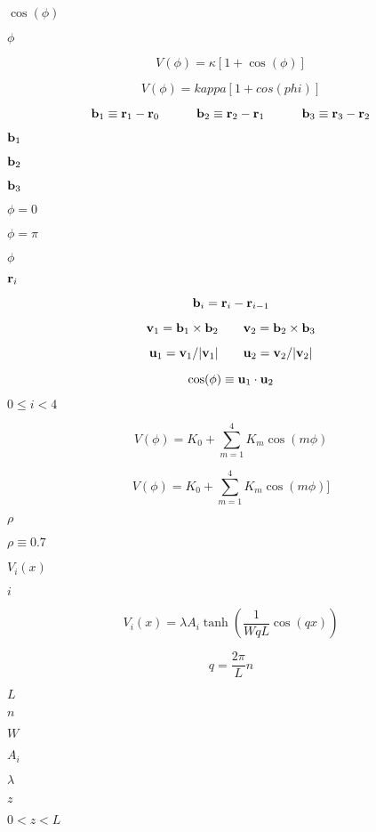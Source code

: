 \documentclass{article}
\begin{document}
$\cos(\phi)$
\pagebreak

$\phi$
\pagebreak

\[ V(\phi) = \kappa [ 1 + \cos(\phi) ] \]
\pagebreak

\[ V(\phi) = kappa [1 + cos(phi)] \]
\pagebreak

\[ {\bf b}_{1} \equiv {\bf r}_{1} - {\bf r}_{0} \quad\quad\quad {\bf b}_{2} \equiv {\bf r}_{2} - {\bf r}_{1} \quad\quad\quad {\bf b}_{3} \equiv {\bf r}_{3} - {\bf r}_{2} \]
\pagebreak

${\bf b}_{1}$
\pagebreak

${\bf b}_{2}$
\pagebreak

${\bf b}_{3}$
\pagebreak

$\phi = 0$
\pagebreak

$\phi = \pi $
\pagebreak

$ \phi $
\pagebreak

$ {\bf r}_{i} $
\pagebreak

\[ {\bf b}_i = {\bf r}_i - {\bf r}_{i-1} \]
\pagebreak

\[ {\bf v}_{1} = {\bf b}_1 \times {\bf b}_2 \quad\quad {\bf v}_{2} = {\bf b}_2 \times {\bf b}_3 \]
\pagebreak

\[ {\bf u}_1 = {\bf v}_{1}/|{\bf v}_{1}| \quad\quad {\bf u}_2 = {\bf v}_{2}/|{\bf v}_{2}| \]
\pagebreak

\[ \cos(\phi) \equiv {\bf u}_1 \cdot {\bf u}_2 \]
\pagebreak

$0 \leq i < 4$
\pagebreak

\[ V(\phi) = K_{0} + \sum_{m=1}^{4} K_{m} \cos(m\phi) \]
\pagebreak

\[ V(\phi) = K_{0} + \sum_{m=1}^{4} K_{m} \cos(m \phi)] \]
\pagebreak

$\rho$
\pagebreak

$\rho \equiv 0.7$
\pagebreak

$V_{i}(x)$
\pagebreak

$i$
\pagebreak

\[ V_{i}(x) = \lambda A_{i} \tanh \left ( \frac{1}{WqL} \cos( qx ) \right) \]
\pagebreak

\[ q = \frac{2\pi}{L}n \]
\pagebreak

$L$
\pagebreak

$n$
\pagebreak

$W$
\pagebreak

$A_{i}$
\pagebreak

$\lambda$
\pagebreak

$z$
\pagebreak

$0 < z < L$
\pagebreak
\end{document}
